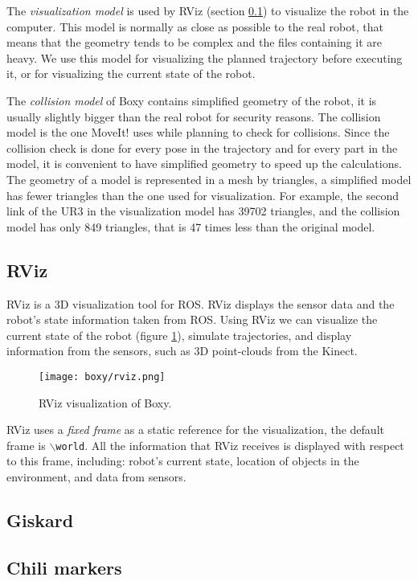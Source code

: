 The \textit{visualization model} is used by RViz (section \ref{subsec:rviz}) to visualize the robot in the computer. This model is normally as close as possible to the real robot, that means that the geometry tends to be complex and the files containing it are heavy. We use this model for visualizing the planned trajectory before executing it, or for visualizing the current state of the robot.

The \textit{collision model} of Boxy contains simplified geometry of the robot, it is usually slightly bigger than the real robot for security reasons. The collision model is the one MoveIt! uses while planning to check for collisions. Since the collision check is done for every pose in the trajectory and for every part in the model, it is convenient to have simplified geometry to speed up the calculations. The geometry of a model is represented in a mesh by triangles, a simplified model has fewer triangles than the one used for visualization. For example, the second link of the UR3 in the visualization model has 39702 triangles, and the collision model has only 849 triangles, that is 47 times less than the original model.

\subsection{RViz}
\label{subsec:rviz}

RViz is a 3D visualization tool for ROS. RViz displays the sensor data and the robot's state information taken from ROS. Using RViz we can visualize the current state of the robot (figure \ref{fig:rviz}), simulate trajectories, and display information from the sensors, such as 3D point-clouds from the Kinect.

\begin{figure}[H]
	\centering
	\texttt{[image: boxy/rviz.png]}
	\vspace{-10pt}
	\caption{RViz visualization of Boxy.}
	\vspace{-15pt}
	\label{fig:rviz}
\end{figure}

RViz uses a \textit{fixed frame} as a static reference for the visualization, the default frame is  \texttt{$\backslash$world}. All the information that RViz receives is displayed with respect to this frame, including: robot's current state, location of objects in the environment, and data from sensors.

\subsection{Giskard}

\subsection{Chili markers}